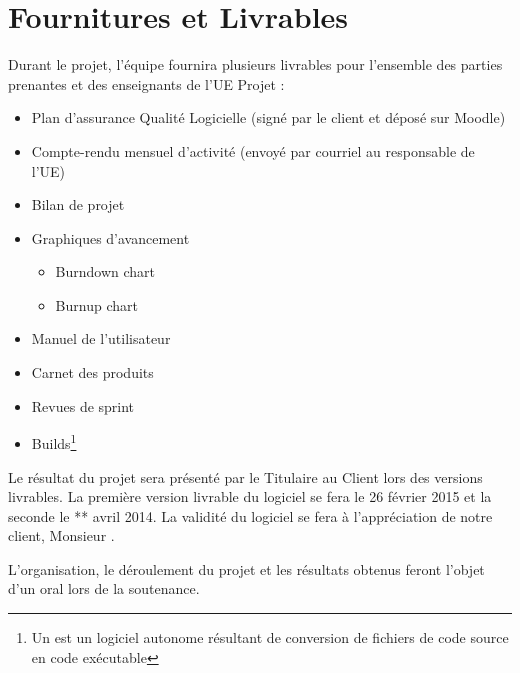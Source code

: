 \chapter{Fournitures et Livrables}
Durant le projet, l’équipe fournira plusieurs livrables pour l’ensemble des parties prenantes et des enseignants de l’UE Projet :

\begin{itemize}
	\item Plan d'assurance Qualité Logicielle (signé par le client et déposé sur Moodle)
	\item Compte-rendu mensuel d'activité (envoyé par courriel au responsable de l'UE)
	\item Bilan de projet
	\item Graphiques d’avancement
	\begin{itemize}
		\item Burndown chart
		\item Burnup chart
	\end{itemize}
	\item Manuel de l’utilisateur
	\item Carnet des produits 
	\item Revues de sprint
	\item Builds\footnote{Un  est un  logiciel autonome résultant de conversion de fichiers de code source en code exécutable}
\end{itemize}

Le résultat du projet sera présenté par le Titulaire au Client lors des versions livrables. La première version livrable du logiciel se fera le 26 février 2015 et la seconde le ** avril 2014. La validité du logiciel se fera à l'appréciation de notre client, Monsieur .

L'organisation, le déroulement du projet et les résultats obtenus feront l'objet d'un oral lors de la soutenance. 